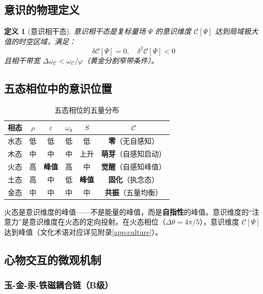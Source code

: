 \documentclass[12pt,a4paper,twocolumn]{article}
\renewcommand{\phi}{\varphi}
\newtheorem{definition}[theorem]{定义}
\begin{document}
\subsection{意识的物理定义}

\begin{definition}[意识相干态]
\label{def:consciousness}
意识相干态是复标量场 $\Psi$ 的意识维度 $\mathcal{C}[\Psi]$ 达到局域极大值的时空区域，满足：
\begin{equation}
\delta\mathcal{C}[\Psi] = 0, \quad \delta^2\mathcal{C}[\Psi] < 0
\end{equation}
且相干带宽 $\Delta\omega_{\mathcal{C}} < \omega_{\mathcal{C}}/\phi$（黄金分割窄带条件）。
\end{definition}

\subsection{五态相位中的意识位置}

\begin{table}[H]
\centering
\footnotesize
\caption{五态相位的五量分布}
\begin{tabular}{c|c|c|c|c|c}
\hline
\textbf{相态} & $\rho$ & $\varepsilon$ & $\omega_\theta$ & $S$ & $\mathcal{C}$ \\
\hline
水态 & 低 & 低 & 低 & 低 & \textbf{零}（无自感知） \\
木态 & 中 & 中 & 中 & 上升 & \textbf{萌芽}（自感知启动） \\
火态 & 高 & \textbf{峰值} & 高 & 中 & \textbf{觉醒}（自感知峰值） \\
土态 & 高 & 中 & 低 & \textbf{峰值} & \textbf{固化}（执念态） \\
金态 & 中 & 中 & 中 & 中 & \textbf{共振}（五量均衡） \\
\hline
\end{tabular}
\end{table}

火态是意识维度的峰值——不是能量的峰值，而是\textbf{自指性}的峰值。意识维度的``注意力''是意识维度在火态的定向投射。在火态相位（$\Delta\theta=4\pi/5$），意识维度 $\mathcal{C}[\Psi]$ 达到峰值（文化术语对应详见附录\ref{app:culture}）。

\subsection{心物交互的微观机制}

\subsubsection{玉-金-汞-铁磁耦合链（B级）}
\end{document}
